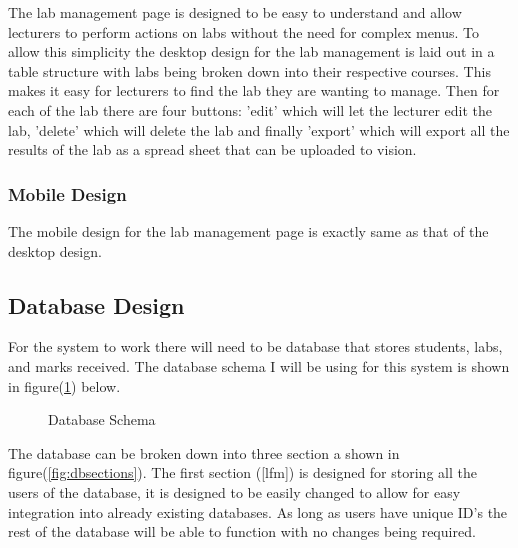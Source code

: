 \documentclass[12pt]{article}  %
\begin{document}
The lab management page is designed to be easy to understand and allow lecturers to perform actions on labs without the need for complex menus. To allow this simplicity the desktop design for the lab management is laid out in a table structure with labs being broken down into their respective courses. This makes it easy for lecturers to find the lab they are wanting to manage. Then for each of the lab there are four buttons: 'edit' which will let the lecturer edit the lab, 'delete' which will delete the lab and finally 'export' which will export all the results of the lab as a spread sheet that can be uploaded to vision.

\subsubsection*{Mobile Design}

The mobile design for the lab management page is exactly same as that of the desktop design.



\newpage
\subsection{Database Design}
\label{sec:design-db}
For the system to work there will need to be database that stores students, labs, and marks received. The database schema I will be using for this system is shown in figure(\ref{fig:dbschema}) below.

\begin{figure}[H]
	\caption{Database Schema}
	\label{fig:dbschema}
\end{figure}

\noindent The database can be broken down into three section a shown in figure(\ref{fig:dbsections}). The first section ([lfm]) is designed for storing all the users of the database, it is designed to be easily changed to allow for easy integration into already existing databases. As long as users have unique ID's the rest of the database will be able to function with no changes being required.
\end{document}
